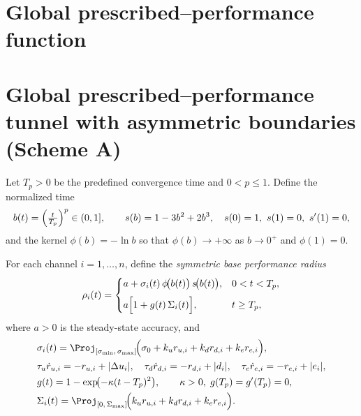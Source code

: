 \documentclass[pdflatex,sn-mathphys-num]{sn-jnl}%
\theoremstyle{thmstyleone}%
\theoremstyle{thmstyletwo}%
\theoremstyle{thmstylethree}%
\begin{document}
\section{Global prescribed–performance function}


\section{Global prescribed--performance tunnel with asymmetric boundaries (Scheme A)}
Let $T_p>0$ be the predefined convergence time and $0<p\le 1$. Define the normalized time
\begin{equation}\label{eq:b-def}
    b(t)=\Bigl(\tfrac{t}{T_p}\Bigr)^{p}\in(0,1],\qquad
    s(b)=1-3b^2+2b^3,\quad s(0)=1,\ s(1)=0,\ s'(1)=0,
\end{equation}
and the kernel $\phi(b)=-\ln b$ so that $\phi(b)\to+\infty$ as $b\to0^+$ and $\phi(1)=0$.

For each channel $i=1,\dots,n$, define the \emph{symmetric base performance radius}
\begin{equation}\label{eq:gppf-base}
\rho_i(t)=
\begin{cases}
\displaystyle a + \sigma_i(t)\,\phi\!\bigl(b(t)\bigr)\,s\!\bigl(b(t)\bigr), & 0<t<T_p,\\[6pt]
\displaystyle a\Bigl[1 + g(t)\,\Sigma_i(t)\Bigr], & t\ge T_p,
\end{cases}
\end{equation}
where $a>0$ is the steady-state accuracy, and
\begin{align}
&\sigma_i(t)=\Proj_{[\sigma_{\min},\,\sigma_{\max}]}\!\Bigl(\sigma_{0}+k_u r_{u,i}+k_d r_{d,i}+k_e r_{e,i}\Bigr),\label{eq:gppf-sigmaA}\\
&\tau_u \dot r_{u,i}=-r_{u,i}+|\Delta u_i|,\quad
  \tau_d \dot r_{d,i}=-r_{d,i}+|d_i|,\quad
  \tau_e \dot r_{e,i}=-r_{e,i}+|e_i|,\label{eq:gppf-rfiltersA}\\
&g(t)=1-\exp\!\bigl(-\kappa (t-T_p)^2\bigr),\qquad \kappa>0,\; g(T_p)=g'(T_p)=0,\label{eq:gppf-gateA}\\
&\Sigma_i(t)=\Proj_{[0,\,\Sigma_{\max}]}\!\Bigl(k_u r_{u,i}+k_d r_{d,i}+k_e r_{e,i}\Bigr).\label{eq:gppf-SigmaA}
\end{align}
\end{document}
